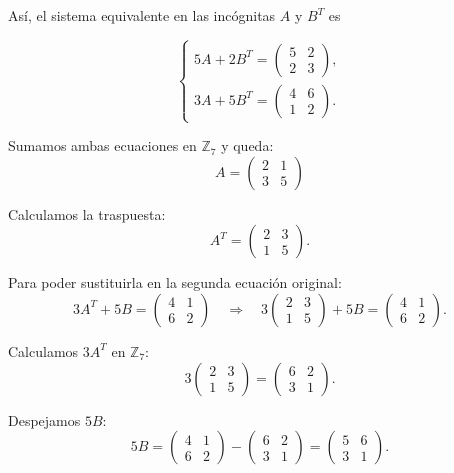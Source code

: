 \documentclass[a4paper,12pt]{article}
\begin{document}
\begin{ejercicio}[title=Ejercicio 5]

Así, el sistema equivalente en las incógnitas \(A\) y \(B^T\) es

\[
\begin{cases}
5A + 2B^T =
\begin{pmatrix}
5 & 2\\
2 & 3
\end{pmatrix},\\[4pt]
3A + 5B^T =
\begin{pmatrix}
4 & 6\\
1 & 2
\end{pmatrix}.
\end{cases}
\]

Sumamos ambas ecuaciones en $\mathbb{Z}_7$ y queda:
\[
A = \begin{pmatrix}2 & 1\\[2pt] 3 & 5\end{pmatrix}
\]

Calculamos la traspuesta:
\[
A^T = \begin{pmatrix}2 & 3\\[2pt] 1 & 5\end{pmatrix}.
\]

Para poder sustituirla en la segunda ecuación original:
\[
3A^T + 5B = \begin{pmatrix}4 & 1\\[2pt] 6 & 2\end{pmatrix}
\quad\Rightarrow\quad
3\begin{pmatrix}2 & 3\\[2pt] 1 & 5\end{pmatrix} + 5B =
\begin{pmatrix}4 & 1\\[2pt] 6 & 2\end{pmatrix}.
\]

Calculamos \(3A^T\) en \(\mathbb{Z}_7\):
\[
3\begin{pmatrix}2 & 3\\[2pt] 1 & 5\end{pmatrix} =
\begin{pmatrix}6 & 2\\[2pt] 3 & 1\end{pmatrix}.
\]

Despejamos \(5B\):
\[
5B =
\begin{pmatrix}4 & 1\\[2pt] 6 & 2\end{pmatrix}
-
\begin{pmatrix}6 & 2\\[2pt] 3 & 1\end{pmatrix}
=
\begin{pmatrix}5 & 6\\[2pt] 3 & 1\end{pmatrix}.
\]


\end{ejercicio}
\end{document}
